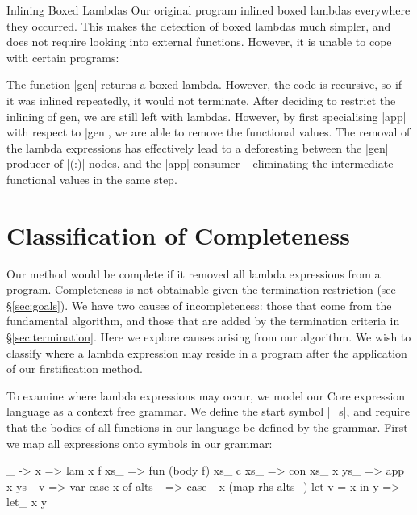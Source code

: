 \documentclass[preprint]{sigplanconf}
\begin{document}
\begin{examplename}{Inlining Boxed Lambdas}
\label{ex:inlining_boxed_lambdas}
Our original program inlined boxed lambdas everywhere they occurred. This makes the detection of boxed lambdas much simpler, and does not require looking into external functions. However, it is unable to cope with certain programs:


The function |gen| returns a boxed lambda. However, the code is recursive, so if it was inlined repeatedly, it would not terminate. After deciding to restrict the inlining of gen, we are still left with lambdas. However, by first specialising |app| with respect to |gen|, we are able to remove the functional values. The removal of the lambda expressions has effectively lead to a deforesting between the |gen| producer of |(:)| nodes, and the |app| consumer -- eliminating the intermediate functional values in the same step.
\end{examplename}



\section{Classification of Completeness}
\label{sec:completeness}

Our method would be complete if it removed all lambda expressions from a program. Completeness is not obtainable given the termination restriction (see \S\ref{sec:goals}). We have two causes of incompleteness: those that come from the fundamental algorithm, and those that are added by the termination criteria in \S\ref{sec:termination}. Here we explore causes arising from our algorithm. We wish to classify where a lambda expression may reside in a program after the application of our firstification method.

To examine where lambda expressions may occur, we model our Core expression language as a context free grammar. We define the start symbol |_s|, and require that the bodies of all functions in our language be defined by the grammar. First we map all expressions onto symbols in our grammar:

\ignore\begin{code}
\vs_ -> x         => lam x
f xs_             => fun (body f) xs_
c xs_             => con xs_
x ys_             => app x ys_
v                 => var
case x of alts_   => case_ x (map rhs alts_)
let v = x in y    => let_ x y
\end{code}
\end{document}
